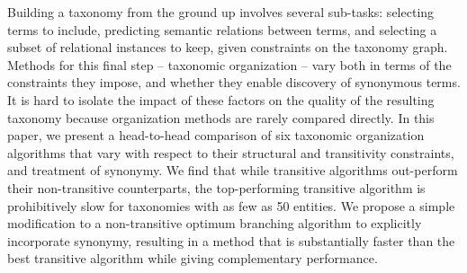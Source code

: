 Building a taxonomy from the ground up involves several sub-tasks: selecting terms to include, predicting semantic relations between terms, and selecting a subset of relational instances to keep, given constraints on the taxonomy graph. Methods for this final step -- taxonomic organization -- vary both in terms of the constraints they impose, and whether they enable discovery of synonymous terms. It is hard to isolate the impact of these factors on the quality of the resulting taxonomy because organization methods are rarely compared directly. In this paper, we present a head-to-head comparison of six taxonomic organization algorithms that vary with respect to their structural and transitivity constraints, and treatment of synonymy. We find that while transitive algorithms out-perform their non-transitive counterparts, the top-performing transitive algorithm is prohibitively slow for taxonomies with as few as 50 entities. We propose a simple modification to a non-transitive optimum branching algorithm to explicitly incorporate synonymy, resulting in a method that is substantially faster than the best transitive algorithm while giving complementary performance.
